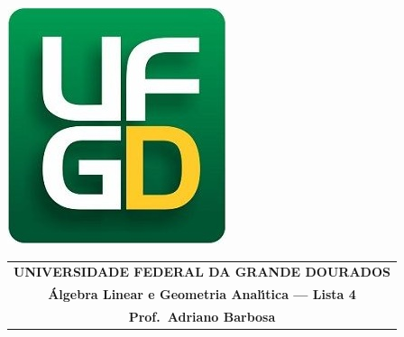 \documentclass[a4paper,5pt]{amsbook}
\begin{document}
\thispagestyle{empty}
\pagestyle{empty}
\begin{minipage}[h]{0.14\textwidth}
	\includegraphics[scale=0.24]{../../ufgd.png}
\end{minipage}
\begin{minipage}[h]{\textwidth}
\begin{tabular}{c}
{{\bf UNIVERSIDADE FEDERAL DA GRANDE DOURADOS}}\\
{{\bf \'{A}lgebra Linear e Geometria Anal\'{\i}tica --- Lista 4}}\\
{{\bf Prof.\ Adriano Barbosa}}\\
\end{tabular}
\vspace{-0.45cm}
%
\end{minipage}

\end{document}
